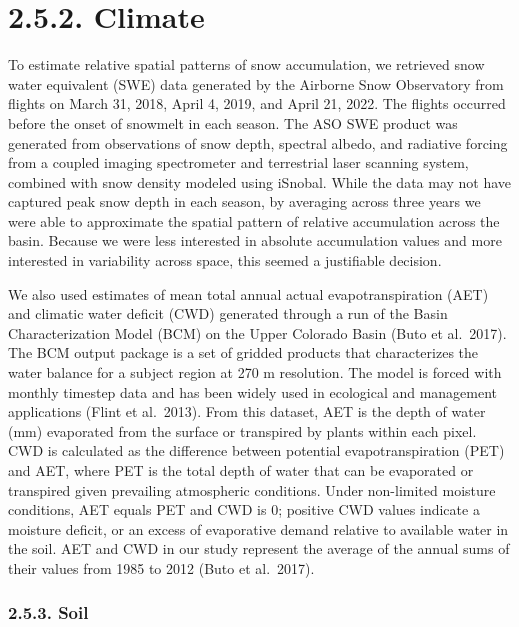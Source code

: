 \documentclass[
  12pt,
]{article}
\begin{document}
\section{2.5.2. Climate}\label{climate}

To estimate relative spatial patterns of snow accumulation, we retrieved
snow water equivalent (SWE) data generated by the Airborne Snow
Observatory from flights on March 31, 2018, April 4, 2019, and April 21,
2022. The flights occurred before the onset of snowmelt in each season.
The ASO SWE product was generated from observations of snow depth,
spectral albedo, and radiative forcing from a coupled imaging
spectrometer and terrestrial laser scanning system, combined with snow
density modeled using iSnobal. While the data may not have captured peak
snow depth in each season, by averaging across three years we were able
to approximate the spatial pattern of relative accumulation across the
basin. Because we were less interested in absolute accumulation values
and more interested in variability across space, this seemed a
justifiable decision.

We also used estimates of mean total annual actual evapotranspiration
(AET) and climatic water deficit (CWD) generated through a run of the
Basin Characterization Model (BCM) on the Upper Colorado Basin (Buto et
al.~2017). The BCM output package is a set of gridded products that
characterizes the water balance for a subject region at 270 m
resolution. The model is forced with monthly timestep data and has been
widely used in ecological and management applications (Flint et
al.~2013). From this dataset, AET is the depth of water (mm) evaporated
from the surface or transpired by plants within each pixel. CWD is
calculated as the difference between potential evapotranspiration (PET)
and AET, where PET is the total depth of water that can be evaporated or
transpired given prevailing atmospheric conditions. Under non-limited
moisture conditions, AET equals PET and CWD is 0; positive CWD values
indicate a moisture deficit, or an excess of evaporative demand relative
to available water in the soil. AET and CWD in our study represent the
average of the annual sums of their values from 1985 to 2012 (Buto et
al.~2017).

\subsubsection{2.5.3. Soil}\label{soil}
\end{document}
